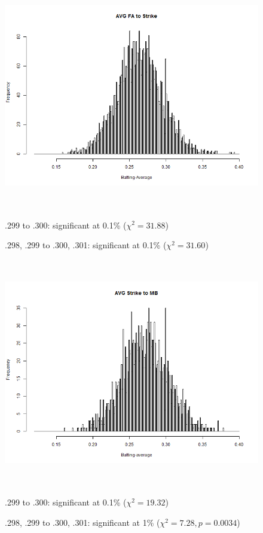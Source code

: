 \documentclass[dvipdfmx]{article}
\begin{document}
 \begin{figure}[H]
   \centering
   \includegraphics[width = 14cm, height = 10cm]
   {graphs/AVG_fast}

   .299 to .300: significant at 0.1\% ($\chi^2 = 31.88$)

   .298, .299 to .300, .301: significant at 0.1\% ($\chi^2 = 31.60$)

 \end{figure}

 \begin{figure}[H]
   \centering
   \includegraphics[width = 14cm, height = 10cm]
   {graphs/AVG_stmb}

   .299 to .300: significant at 0.1\% ($\chi^2 = 19.32$)

   .298, .299 to .300, .301: significant at 1\% ($\chi^2 = 7.28, p = 0.0034$)
 \end{figure}
\end{document}
